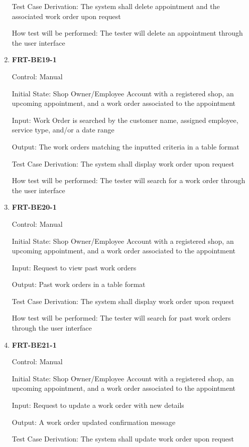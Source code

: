 \documentclass[12pt, titlepage]{article}
\begin{document}
\begin{enumerate}
	      Test Case Derivation: The system shall delete appointment and the associated work order upon
	      request

	      How test will be performed: The tester will delete an appointment through the user interface

	\item \textbf{FRT-BE19-1}

	      Control: Manual

	      Initial State: Shop Owner/Employee Account with a registered shop, an upcoming appointment, and a
	      work order associated to the appointment

	      Input: Work Order is searched by the customer name, assigned employee, service type, and/or a date
	      range

	      Output: The work orders matching the inputted criteria in a table format

	      Test Case Derivation: The system shall display work order upon request

	      How test will be performed: The tester will search for a work order through the user interface

	\item \textbf{FRT-BE20-1}

	      Control: Manual

	      Initial State: Shop Owner/Employee Account with a registered shop, an upcoming appointment, and a
	      work order associated to the appointment

	      Input: Request to view past work orders

	      Output: Past work orders in a table format

	      Test Case Derivation: The system shall display work order upon request

	      How test will be performed: The tester will search for past work orders through the user interface

	\item \textbf{FRT-BE21-1}

	      Control: Manual

	      Initial State: Shop Owner/Employee Account with a registered shop, an upcoming appointment, and a
	      work order associated to the appointment

	      Input: Request to update a work order with new details

	      Output: A work order updated confirmation message

	      Test Case Derivation: The system shall update work order upon request


\end{enumerate}
\end{document}
